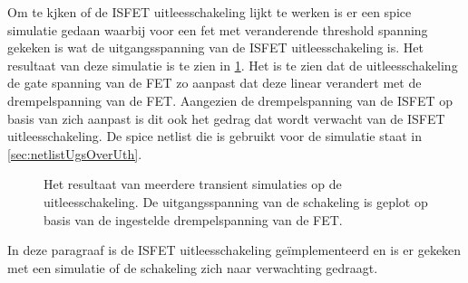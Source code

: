 
Om te kjken of de ISFET uitleesschakeling lijkt te werken is er een spice simulatie gedaan waarbij voor een fet met veranderende threshold spanning gekeken is wat de uitgangsspanning van de ISFET uitleesschakeling is. Het resultaat van deze simulatie is te zien in \cref{fig:readoutSimTrans}. Het is te zien dat de uitleesschakeling de gate spanning van de FET zo aanpast dat deze linear verandert met de drempelspanning van de FET. Aangezien de drempelspanning van de ISFET op basis van \si{\pH} zich aanpast is dit ook het gedrag dat wordt verwacht van de ISFET uitleesschakeling. De spice netlist die is gebruikt voor de simulatie staat in \cref{sec:netlistUgsOverUth}.
\begin{figure}[!htbp]
    \centering
    \pgfplotsset{width=0.7\textwidth}
    
    \caption{Het resultaat van meerdere transient simulaties op de uitleesschakeling. De uitgangsspanning van de schakeling is geplot op basis van de ingestelde drempelspanning van de FET.}
    \label{fig:readoutSimTrans}
\end{figure}

In deze paragraaf is de ISFET uitleesschakeling geïmplementeerd en is er gekeken met een simulatie of de schakeling zich naar verwachting gedraagt.